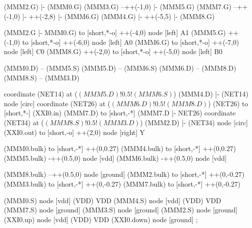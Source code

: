 \begin{circuitikz}[american]
		
	(MMM2.G) |- (MMM0.G)
	(MMM3.G) --++(-1,0) |- (MMM5.G)
	(MMM7.G) --++(-1,0) |- ++(-2,8) |- (MMM6.G)
	(MMM4.G) |- ++(-5,5) |- (MMM8.G)
	
	(MMM2.G |- MMM0.G) to [short,*-o] ++(-4,0) node [left] {A1}
	(MMM5.G) ++(-1,0) to [short,*-o] ++(-6,0) node [left] {A0}
	(MMM6.G) to [short,*-o] ++(-7,0) node [left] {C0}
	(MMM8.G) ++(-2,0) to [short,*-o] ++(-5,0) node [left] {B0}
	
	(MMM0.D) -- (MMM5.S)
	(MMM5.D) -- (MMM6.S)
	(MMM6.D) -- (MMM8.D)
	(MMM8.S) -- (MMM3.D)
	
	coordinate (NET14) at ($(MMM5.D)!0.5!(MMM6.S)$)
	(MMM4.D) |- (NET14) node [circ] {}
	coordinate (NET26) at ($(MMM6.D)!0.5!(MMM8.D)$)
	(NET26) to [short,*-] (XXI0.in)
	(MMM7.D) to [short,-*] (MMM7.D |- NET26)
	coordinate (NET34) at ($(MMM8.S)!0.5!(MMM3.D)$)
	(MMM2.D) |- (NET34) node [circ] {}
	(XXI0.out) to [short,-o] ++(2,0) node [right] {Y}
	
	(MMM0.bulk) to [short,-*] ++(0,0.27)
	(MMM4.bulk) to [short,-*] ++(0,0.27)
	(MMM5.bulk) -++(0.5,0) node [vdd]{}
	(MMM6.bulk) -++(0.5,0) node [vdd]{}
	
	(MMM8.bulk) --++(0.5,0) node [ground]{}	
	(MMM2.bulk) to [short,-*] ++(0,-0.27)
	(MMM3.bulk) to [short,-*] ++(0,-0.27)
	(MMM7.bulk) to [short,-*] ++(0,-0.27)


	(MMM0.S) node [vdd] (VDD) {VDD}
	(MMM4.S) node [vdd] (VDD) {VDD}
	(MMM7.S) node [ground] {}
	(MMM3.S) node [ground] {}
	(MMM2.S) node [ground] {}
	(XXI0.up) node [vdd] (VDD) {VDD}
	(XXI0.down) node [ground] {}
;

\end{circuitikz}
